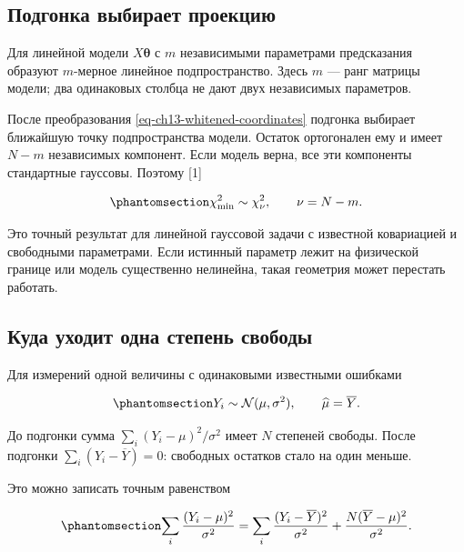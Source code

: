 \documentclass[
  russian,
  11pt,
  a4paper,
  open=any]{scrbook}
\begin{document}
\subsection{Подгонка выбирает
проекцию}\label{ux43fux43eux434ux433ux43eux43dux43aux430-ux432ux44bux431ux438ux440ux430ux435ux442-ux43fux440ux43eux435ux43aux446ux438ux44e}

Для линейной модели \(X\boldsymbol\theta\) с \(m\) независимыми
параметрами предсказания образуют \(m\)-мерное линейное подпространство.
Здесь \(m\) --- ранг матрицы модели; два одинаковых столбца не дают двух
независимых параметров.

После преобразования \ref{eq-ch13-whitened-coordinates} подгонка
выбирает ближайшую точку подпространства модели. Остаток ортогонален ему
и имеет \(N-m\) независимых компонент. Если модель верна, все эти
компоненты стандартные гауссовы. Поэтому {[}1{]}

\begin{equation}\protect\phantomsection\label{eq-ch13-fitted-degrees-of-freedom}{
\chi^2_{\min}\sim\chi^2_\nu,
\qquad \nu=N-m.
}\end{equation}

Это точный результат для линейной гауссовой задачи с известной
ковариацией и свободными параметрами. Если истинный параметр лежит на
физической границе или модель существенно нелинейна, такая геометрия
может перестать работать.

\subsection{Куда уходит одна степень
свободы}\label{ux43aux443ux434ux430-ux443ux445ux43eux434ux438ux442-ux43eux434ux43dux430-ux441ux442ux435ux43fux435ux43dux44c-ux441ux432ux43eux431ux43eux434ux44b}

Для измерений одной величины с одинаковыми известными ошибками

\begin{equation}\protect\phantomsection\label{eq-ch13-common-mean}{
Y_i\sim\mathcal N(\mu,\sigma^2),
\qquad
\widehat\mu=\overline Y.
}\end{equation}

До подгонки сумма \(\sum_i(Y_i-\mu)^2/\sigma^2\) имеет \(N\) степеней
свободы. После подгонки \(\sum_i(Y_i-\overline Y)=0\): свободных
остатков стало на один меньше.

Это можно записать точным равенством

\begin{equation}\protect\phantomsection\label{eq-ch13-mean-decomposition}{
\sum_i\frac{(Y_i-\mu)^2}{\sigma^2}
=
\sum_i\frac{(Y_i-\overline Y)^2}{\sigma^2}
+\frac{N(\overline Y-\mu)^2}{\sigma^2}.
}\end{equation}
\end{document}
